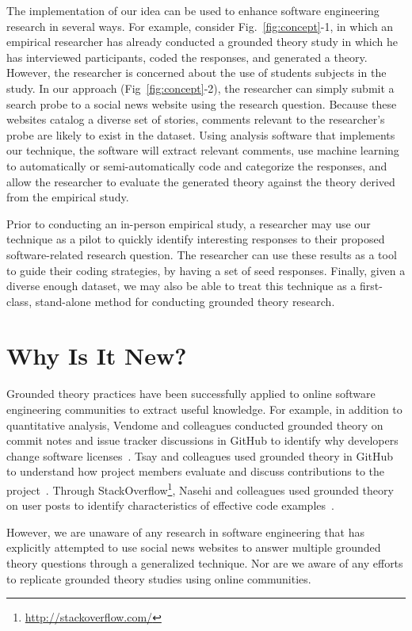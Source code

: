 \documentclass{sig-alternate}
\begin{document}
The implementation of our idea can be used to enhance software engineering research in several ways.  For example, consider Fig.~\ref{fig:concept}-1, in which an empirical researcher has already conducted a grounded theory study in which he has interviewed participants, coded the responses, and generated a theory. However, the researcher is concerned about the use of students subjects in the study. In our approach (Fig~\ref{fig:concept}-2), the researcher can simply submit a search probe to a social news website using the research question. Because these websites catalog a diverse set of stories, comments relevant to the researcher's probe are likely to exist in the dataset. Using analysis software that implements our technique, the software will extract relevant comments, use machine learning to automatically or semi-automatically code and categorize the responses, and allow the researcher to evaluate the generated theory against the theory derived from the empirical study.

Prior to conducting an in-person empirical study, a researcher may use our technique as a pilot to quickly identify interesting responses to their proposed software-related research question. The researcher can use these results as a tool to guide their coding strategies, by having a set of seed responses. Finally, given a diverse enough dataset, we may also be able to treat this technique as a first-class, stand-alone method for conducting grounded theory research.


\section{Why Is It New?}

Grounded theory practices have been successfully applied to online software engineering communities to extract useful knowledge.
For example, in addition to quantitative analysis, Vendome and colleagues conducted grounded theory on commit notes and issue tracker discussions in GitHub to identify why developers change software licenses~\cite{Vendome2015}. Tsay and colleagues used grounded theory in GitHub to understand how project members evaluate and discuss contributions to the project~\cite{Tsay2014}. Through StackOverflow\footnote{\url{http://stackoverflow.com/}}, Nasehi and colleagues used grounded theory on user posts to identify characteristics of effective code examples~\cite{Nasehi2012}.

However, we are unaware of any research in software engineering that has explicitly attempted to use social news websites to answer multiple grounded theory questions through a generalized technique. Nor are we aware of any efforts to replicate grounded theory studies using online communities.
\end{document}
